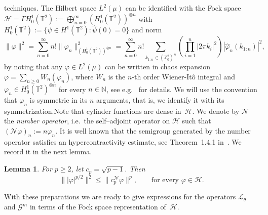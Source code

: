 \documentclass{article}
\newcommand{\assign}{:=}
\newcommand{\tmtextit}[1]{{\itshape{#1}}}
\newtheorem{lemma}{Lemma}
\begin{document}
techniques. The Hilbert space $L^2 (\mu)$ can be identified with the Fock
space $\mathcal{H}= \Gamma H^1_0 (\mathbb{T}^2) \assign \bigoplus_{n =
0}^{\infty} (H^1_0 (\mathbb{T}^2))^{\otimes n}$ with $H^1_0 (\mathbb{T}^2)
\assign \{ \psi \in H^1 (\mathbb{T}^2) : \hat{\psi} (0) = 0 \}$ and norm
\[ \| \varphi \|^2 = \sum_{n = 0}^{\infty} n! \| \varphi_n \|^2_{(H^1_0
   (\mathbb{T}^2))^{\otimes n}} = \sum_{n = 0}^{\infty} n! \sum_{k_{1 : n} \in
   (\mathbb{Z}^2_0)^n} \left( \prod_{i = 1}^n | 2 \pi k_i |^2  \right)  |
   \hat{\varphi}_n (k_{1 : n}) |^2, \]
by noting that any $\varphi \in L^2 (\mu)$ can be written in chaos expansion
$\varphi = \sum_{n \geq 0} W_n (\varphi_n)$, where $W_n$ is the $n$-th order
Wiener-It{\^o} integral and $\varphi_n \in H^1_0 (\mathbb{T}^2)^{\otimes n}$
for every $n \in \mathbb{N}$, see
e.g.~{\cite{janson1997gaussian,nualart2006malliavin}} for details. We will use
the convention that $\varphi_n$ is symmetric in its $n$ arguments, that is, we
identify it with its symmetrization.\quad Note that cylinder functions are
dense in~$\mathcal{H}$. We denote by $\mathcal{N}$ the \tmtextit{number
operator}, i.e.~the self--adjoint operator on $\mathcal{H}$ such that
$(\mathcal{N} \varphi)_n \assign n \varphi_n$. It is well known that the
semigroup generated by the number operator satisfies an hypercontractivity
estimate, see Theorem~1.4.1 in~{\cite{nualart2006malliavin}}. We record it in
the next lemma.

\begin{lemma}
  \label{lemma:hyper-n}For $p \geqslant 2$, let $c_p = \sqrt{p - 1}$. Then
  \[ \| | \varphi |^{p / 2} \|^2 \leqslant \| c_p^{\mathcal{N}} \varphi \|^p,
     \qquad \text{for every } \varphi \in \mathcal{H}. \]
\end{lemma}

With these preparations we are ready to give expressions for the operators
$\mathcal{L}_{\theta}$ and $\mathcal{G}^m$ in terms of the Fock space
representation of~$\mathcal{H}$.
\end{document}
